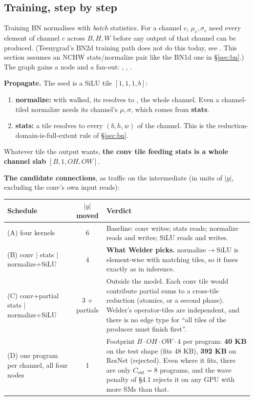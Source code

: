 \subsection{Training, step by step}
\label{sec:welder-train}

Training BN normalises with \emph{batch} statistics. For a channel $c$,
$\mu_c, \sigma_c$ need every element of channel $c$ across $B, H, W$ before any
output of that channel can be produced. (Teenygrad's BN2d training path does not do
this today, see . This section assumes an NCHW stats/normalize
pair like the BN1d one in \S\ref{sec:bn}.) The graph gains a node and a fan-out:
, ,
.

\textbf{Propagate.} The seed is a SiLU tile $[1,1,1,b]$:
\begin{enumerate}
\item \textbf{normalize:} with  walked, its  resolves to
  \code{[None, 1]}, the whole channel. Even a channel-tiled normalize needs its
  channel's $\mu, \sigma$, which comes from \textbf{stats}.
\item \textbf{stats:} a  tile \code{[1]} resolves  to every
  $(b, h, w)$ of the channel. This is the reduction-domain-is-full-extent rule of
  \S\ref{sec:bn}.
\end{enumerate}
Whatever tile the output wants, \textbf{the conv tile feeding stats is a whole
channel slab} $[B, 1, OH, OW]$.

\textbf{The candidate connections}, as traffic on the intermediate (in units of
$|y|$, excluding the conv's own input reads):

{\small
\begin{xltabular}{\linewidth}{>{\raggedright\arraybackslash}p{5.2cm}c>{\raggedright\arraybackslash}X}
\toprule
\textbf{Schedule} & \textbf{$|y|$ moved} & \textbf{Verdict} \\
\midrule
\endhead
(A) four kernels & 6 & Baseline: conv writes; stats reads; normalize reads and writes; SiLU reads and writes. \\
(B) conv $|$ stats $|$ normalize+SiLU & 4 & \textbf{What Welder picks.} normalize$\to$SiLU is element-wise with matching tiles, so it fuses exactly as in inference. \\
(C) conv+partial stats $|$ normalize+SiLU & 3 + partials & Outside the model. Each conv tile would contribute partial sums to a cross-tile reduction (atomics, or a second phase). Welder's operator-tiles are independent, and there is no edge type for ``all tiles of the producer must finish first''. \\
(D) one program per channel, all four nodes & 1 & Footprint $B\cdot OH\cdot OW\cdot 4$ per program: \textbf{40 KB} on the test shape (fits 48 KB), \textbf{392 KB} on ResNet (rejected). Even where it fits, there are only $C_{\text{out}} = 8$ programs, and the wave penalty of \S4.1 rejects it on any GPU with more SMs than that. \\
\bottomrule
\end{xltabular}
}

